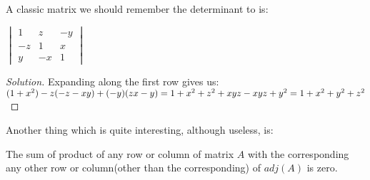 A classic matrix we should remember the determinant to is:\\
\begin{example}
    $\begin{vmatrix}
        1 & z & -y\\
        -z & 1 & x\\
        y & -x & 1
    \end{vmatrix}$
\end{example}
\begin{proof}
    [Solution]
    Expanding along the first row gives us:\\
    $(1+x^2)-z(-z-xy)+(-y)(zx-y)\\
    = 1+x^2+z^2+xyz-xyz+y^2\\
    =1+x^2+y^2+z^2$
\end{proof}
Another thing which is quite interesting, although useless, is:\\
\begin{theorem}
    The sum of product of any row or column of matrix $A$ with the corresponding any other row or column(other than the corresponding) of $adj(A)$ is zero.
\end{theorem}
